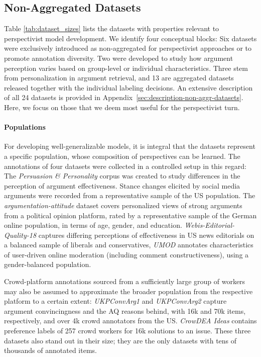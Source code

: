 \subsection{Non-Aggregated Datasets}
\label{sec:non-aggr-datasets}

Table \ref{tab:dataset_sizes} lists the datasets with properties relevant to perspectivist model development. We identify four conceptual blocks: Six datasets were exclusively introduced as {non-aggregated for perspectivist approaches or to promote annotation diversity}. Two were developed to study {how argument perception varies based on group-level or individual characteristics}. Three stem from {personalization in argument retrieval}, and 13 are {aggregated datasets released together with the individual labeling decisions}. An extensive description of all 24 datasets is provided in Appendix~\ref{sec:description-non-aggr-datasets}. Here, we focus on those that we deem most useful for the perspectivist turn.

\paragraph{Populations}

For developing well-generalizable models, it is integral that the datasets represent a specific population, whose composition of perspectives can be learned. The annotations of four datasets were collected in a controlled setup in this regard: The \textit{Persuasion \& Personality} corpus \cite{lukin-etal-2017-argument} was created to study differences in the perception of argument effectiveness. Stance changes elicited by social media arguments were recorded from a representative sample of the US population. The \textit{argumentation-attitude} dataset \cite{brenneis-etal-2021-will} covers personalized views of strong arguments from a political opinion platform, rated by a representative sample of the German online population, in terms of age, gender, and education. \textit{Webis-Editorial-Quality-18} \cite{el-baff-etal-2018-challenge} captures differing perceptions of effectiveness in US news editorials on a balanced sample of liberals and conservatives, \textit{UMOD} \cite{falk-etal-2024-moderation} annotates characteristics of user-driven online moderation (including comment constructiveness), using a gender-balanced population.

Crowd-platform annotations sourced from a sufficiently large group of workers may also be assumed to approximate the broader population from the respective platform to a certain extent: \textit{UKPConvArg1} and \textit{UKPConvArg2} \cite{habernal-gurevych-2016-makes,habernal-gurevych-2016-argument} capture argument convincingness and the AQ reasons behind, with 16k and 70k items, respectively, and over 4k crowd annotators from the US. \textit{CrowDEA Ideas} \cite{Baba_Li_Kashima_2020} contains preference labels of 257 crowd workers for 16k solutions to an issue. These three datasets also stand out in their size; they are the only datasets with tens of thousands of annotated items.

